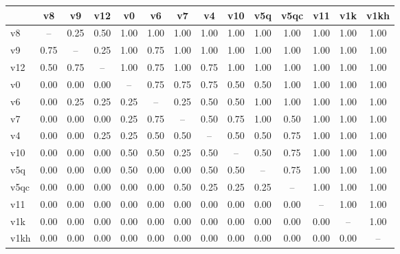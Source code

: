 \begin{tabular}{lccccccccccccc}
\toprule
 & v8 & v9 & v12 & v0 & v6 & v7 & v4 & v10 & v5q & v5qc & v11 & v1k & v1kh \\
\midrule
v8 & -- & 0.25 & 0.50 & 1.00 & 1.00 & 1.00 & 1.00 & 1.00 & 1.00 & 1.00 & 1.00 & 1.00 & 1.00 \\
v9 & 0.75 & -- & 0.25 & 1.00 & 0.75 & 1.00 & 1.00 & 1.00 & 1.00 & 1.00 & 1.00 & 1.00 & 1.00 \\
v12 & 0.50 & 0.75 & -- & 1.00 & 0.75 & 1.00 & 0.75 & 1.00 & 1.00 & 1.00 & 1.00 & 1.00 & 1.00 \\
v0 & 0.00 & 0.00 & 0.00 & -- & 0.75 & 0.75 & 0.75 & 0.50 & 0.50 & 1.00 & 1.00 & 1.00 & 1.00 \\
v6 & 0.00 & 0.25 & 0.25 & 0.25 & -- & 0.25 & 0.50 & 0.50 & 1.00 & 1.00 & 1.00 & 1.00 & 1.00 \\
v7 & 0.00 & 0.00 & 0.00 & 0.25 & 0.75 & -- & 0.50 & 0.75 & 1.00 & 0.50 & 1.00 & 1.00 & 1.00 \\
v4 & 0.00 & 0.00 & 0.25 & 0.25 & 0.50 & 0.50 & -- & 0.50 & 0.50 & 0.75 & 1.00 & 1.00 & 1.00 \\
v10 & 0.00 & 0.00 & 0.00 & 0.50 & 0.50 & 0.25 & 0.50 & -- & 0.50 & 0.75 & 1.00 & 1.00 & 1.00 \\
v5q & 0.00 & 0.00 & 0.00 & 0.50 & 0.00 & 0.00 & 0.50 & 0.50 & -- & 0.75 & 1.00 & 1.00 & 1.00 \\
v5qc & 0.00 & 0.00 & 0.00 & 0.00 & 0.00 & 0.50 & 0.25 & 0.25 & 0.25 & -- & 1.00 & 1.00 & 1.00 \\
v11 & 0.00 & 0.00 & 0.00 & 0.00 & 0.00 & 0.00 & 0.00 & 0.00 & 0.00 & 0.00 & -- & 1.00 & 1.00 \\
v1k & 0.00 & 0.00 & 0.00 & 0.00 & 0.00 & 0.00 & 0.00 & 0.00 & 0.00 & 0.00 & 0.00 & -- & 1.00 \\
v1kh & 0.00 & 0.00 & 0.00 & 0.00 & 0.00 & 0.00 & 0.00 & 0.00 & 0.00 & 0.00 & 0.00 & 0.00 & -- \\
\bottomrule
\end{tabular}
